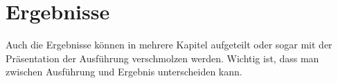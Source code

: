 \chapter{Ergebnisse}\label{ch:results}
Auch die Ergebnisse können in mehrere Kapitel aufgeteilt oder sogar mit der Präsentation der Ausführung verschmolzen werden.
Wichtig ist, dass man zwischen Ausführung und Ergebnis unterscheiden kann.
